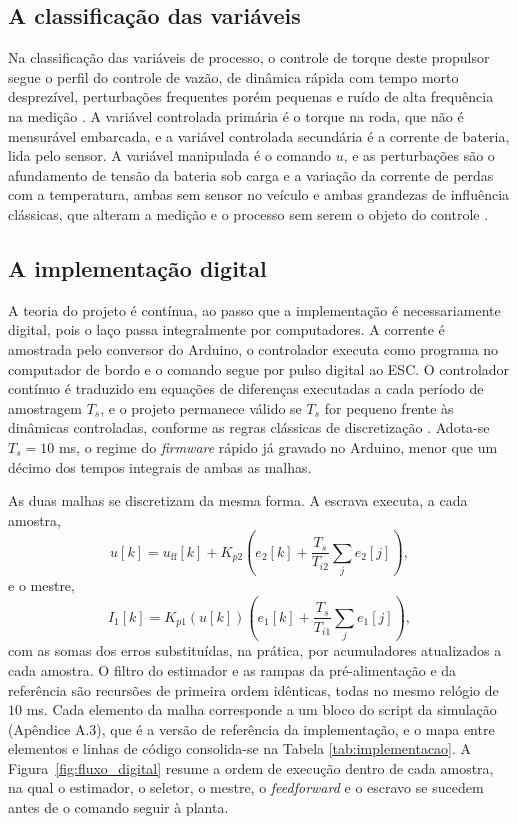 \subsection{A classificação das variáveis}
\label{sec:variaveis}

Na classificação das variáveis de processo, o controle de torque deste propulsor segue o
perfil do controle de vazão, de dinâmica rápida com tempo morto desprezível, perturbações
frequentes porém pequenas e ruído de alta frequência na medição
\cite{raffo_tcpi_variaveis}. A variável controlada primária é o torque na roda, que não é
mensurável embarcada, e a variável controlada secundária é a corrente de bateria, lida pelo
sensor. A variável manipulada é o comando $u$, e as perturbações são o afundamento de
tensão da bateria sob carga e a variação da corrente de perdas com a temperatura, ambas
sem sensor no veículo e ambas grandezas de influência clássicas, que alteram a medição e o
processo sem serem o objeto do controle \cite{braga_instr_config}.

\subsection{A implementação digital}
\label{sec:implementacao}

A teoria do projeto é contínua, ao passo que a implementação é necessariamente digital, pois o
laço passa integralmente por computadores. A corrente é amostrada pelo conversor do
Arduino, o controlador executa como programa no computador de bordo e o comando segue por
pulso digital ao ESC. O controlador contínuo é traduzido em equações de diferenças
executadas a cada período de amostragem $T_s$, e o projeto permanece válido se $T_s$ for
pequeno frente às dinâmicas controladas, conforme as regras clássicas de discretização
\cite{raffo_tcpi_sintese}. Adota-se $T_s = 10$ ms, o regime do \emph{firmware} rápido já
gravado no Arduino, menor que um décimo dos tempos integrais de ambas as malhas.

As duas malhas se discretizam da mesma forma. A escrava executa, a cada amostra,
\begin{equation}\label{eq:discretizacao_escrava}
u[k] = u_\mathrm{ff}[k] + K_{p2}\left(e_2[k] + \frac{T_s}{T_{i2}}\sum_j e_2[j]\right),
\end{equation}
e o mestre,
\begin{equation}\label{eq:discretizacao_mestre}
I_1[k] = K_{p1}(u[k])\left(e_1[k] + \frac{T_s}{T_{i1}}\sum_j e_1[j]\right),
\end{equation}
com as somas dos erros substituídas, na prática, por acumuladores atualizados a cada
amostra. O filtro do estimador e as rampas da pré-alimentação e da referência são
recursões de primeira ordem idênticas, todas no mesmo relógio de $10$ ms. Cada elemento da
malha corresponde a um bloco do script da simulação (Apêndice A.3), que é a versão de
referência da implementação, e o mapa entre elementos e linhas de
código consolida-se na Tabela \ref{tab:implementacao}. A
Figura~\ref{fig:fluxo_digital} resume a ordem de execução dentro de cada amostra, na
qual o estimador, o seletor, o mestre, o \emph{feedforward} e o escravo se sucedem
antes de o comando seguir à planta.

